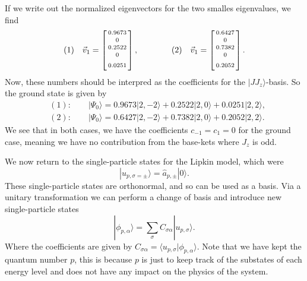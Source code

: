 \documentclass[a4paper, 11pt, notitlepage, english]{article}
\newcommand{\ket}[1]{|#1 \rangle}
\newcommand{\braket}[2]{\langle #1 | #2 \rangle}
\newcommand{\op}[1]{\hat{#1}}
\begin{document}
If we write out the normalized eigenvectors for the two smalles eigenvalues, we find
$$(1) \quad \vec{v}_1 = \left[\begin{smallmatrix}
0.9673  \\[0.1cm] 0 \\[0.1cm]    0.2522  \\[0.1cm] 0  \\[0.1cm] 0.0251 \strut
\end{smallmatrix}\right], \qquad\qquad
(2) \quad \vec{v}_1 = \left[\begin{smallmatrix}
0.6427 \\[0.1cm] 0 \\[0.1cm]  0.7382 \\[0.1cm] 0 \\[0.1cm] 0.2052 \strut
\end{smallmatrix}\right].$$
Now, these numbers should be interpred as the coefficients for the $\ket{J J_z}$-basis. So the ground state is given by
\begin{align*}
&(1): \qquad \ket{\Psi_0} = 0.9673 \ket{2, -2} + 0.2522 \ket{2, 0} + 0.0251 \ket{2, 2}, \\
&(2): \qquad \ket{\Psi_0} = 0.6427 \ket{2, -2} + 0.7382 \ket{2, 0} + 0.2052 \ket{2, 2}.
\end{align*}
We see that in both cases, we have the coefficients $c_{-1}=c_1 = 0$ for the ground case, meaning we have no contribution from the base-kets where $J_z$ is odd. 

\clearpage

We now return to the single-particle states for the Lipkin model, which were
$$\ket{u_{p, \sigma=\pm}} = \op{a}_{p, \pm} \ket{0}. $$
These single-particle states are orthonormal, and so can be used as a basis. Via a unitary transformation we can perform a change of basis and introduce new single-particle states
$$\ket{\phi_{p, \alpha}} = \sum_{\sigma} C_{\sigma\alpha} \ket{u_{p,\sigma}}.$$
Where the coefficients are given by $C_{\sigma\alpha} = \braket{u_{p,\sigma}}{\phi_{p,\alpha}}$. Note that we have kept the quantum number $p$, this is because $p$ is just to keep track of the substates of each energy level and does not have any impact on the physics of the system.
\end{document}
